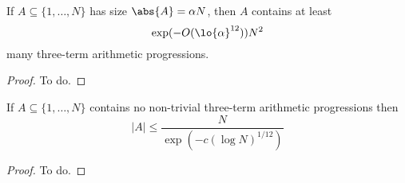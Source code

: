 \begin{theorem}\label{main-int-count}
If $A\subseteq \{1,\ldots,N\}$ has size $\abs{A}=\alpha N$, then $A$ contains at least
\[\exp(-O(\lo{\alpha}^{12}))N^2\]
many three-term arithmetic progressions.
\end{theorem}
\begin{proof}
To do.
\end{proof}

\begin{theorem}
  \label{int}
  \uses{}
  \leanok
  If $A\subseteq \{1,\ldots,N\}$ contains no non-trivial three-term arithmetic progressions then
  \[\lvert A\rvert \leq \frac{N}{\exp(-c(\log N)^{1/12})}\]
\end{theorem}
\begin{proof}
  To do.
\end{proof}
